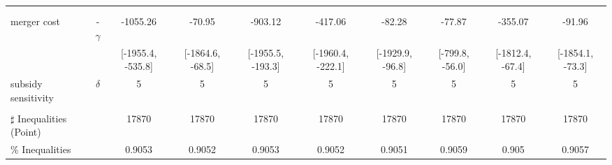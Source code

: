 \begin{tabular}{@{\extracolsep{5pt}}lccccccccc}
 &  &  &  &  &  &  &  &  &  \\
 &  &  &  &  &  &  &  &  &  \\
merger cost & -$\gamma$ & -1055.26 & -70.95 & -903.12 & -417.06 & -82.28 & -77.87 & -355.07 & -91.96 \\
 &  & [-1955.4, -535.8] & [-1864.6, -68.5] & [-1955.5, -193.3] & [-1960.4, -222.1] & [-1929.9, -96.8] & [-799.8, -56.0] & [-1812.4, -67.4] & [-1854.1, -73.3] \\
subsidy sensitivity & $\delta$ & 5 & 5 & 5 & 5 & 5 & 5 & 5 & 5 \\
 &  &  &  &  &  &  &  &  &  \\
\hline 
$\sharp$ Inequalities (Point) &  & 17870 & 17870 & 17870 & 17870 & 17870 & 17870 & 17870 & 17870 \\
\% Inequalities &  & 0.9053 & 0.9052 & 0.9053 & 0.9052 & 0.9051 & 0.9059 & 0.905 & 0.9057 \\
\bottomrule 
\end{tabular}
